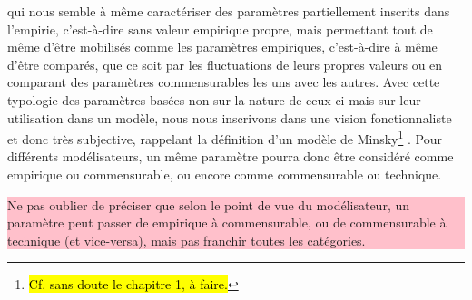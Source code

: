 \documentclass[12pt, a4paper, oneside]{book}
\begin{document}
	qui nous semble à même caractériser des paramètres partiellement inscrits dans l'empirie, c'est-à-dire sans valeur empirique propre, mais permettant tout de même d'être mobilisés comme les paramètres empiriques, c'est-à-dire à même d'être comparés, que ce soit par les fluctuations de leurs propres valeurs ou en comparant des paramètres commensurables les uns avec les autres. Avec cette typologie des paramètres basées non sur la nature de ceux-ci mais sur leur utilisation dans un modèle, nous nous inscrivons dans une vision fonctionnaliste et donc très subjective, rappelant la définition d'un modèle de Minsky\footnote{\hl{Cf. sans doute le chapitre 1, à faire.}} \autocite{minsky_matter_1965}. Pour différents modélisateurs, un même paramètre pourra donc être considéré comme empirique ou commensurable, ou encore comme commensurable ou technique.
	\colorbox{pink}{\parbox{0.9\textwidth}{%
		\vskip5pt
			Ne pas oublier de préciser que selon le point de vue du modélisateur, un paramètre peut passer de empirique à commensurable, ou de commensurable à technique (et vice-versa), mais pas \og franchir\fg{} toutes les catégories.
			\vskip5pt
		}
	}
	
\end{document}

